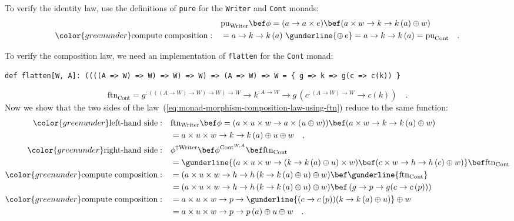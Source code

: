 To verify the identity law, use the definitions of \lstinline!pure!
for the \lstinline!Writer! and \lstinline!Cont! monads:
\begin{align*}
 & \text{pu}_{\text{Writer}}\bef\phi=(a\rightarrow a\times e)\bef(a\times w\rightarrow k\rightarrow k\left(a\right)\oplus w)\\
{\color{greenunder}\text{compute composition}:}\quad & =a\rightarrow k\rightarrow k\left(a\right)\,\gunderline{\oplus\,e}=a\rightarrow k\rightarrow k\left(a\right)=\text{pu}_{\text{Cont}}\quad.
\end{align*}

To verify the composition law, we need an implementation of \lstinline!flatten!
for the \lstinline!Cont! monad:
\begin{lstlisting}
def flatten[W, A]: ((((A => W) => W) => W) => W) => (A => W) => W = { g => k => g(c => c(k)) }
\end{lstlisting}
\[
\text{ftn}_{\text{Cont}}=g^{:\left(\left(\left(A\rightarrow W\right)\rightarrow W\right)\rightarrow W\right)\rightarrow W}\rightarrow k^{:A\rightarrow W}\rightarrow g\,(c^{:\left(A\rightarrow W\right)\rightarrow W}\rightarrow c\left(k\right))\quad.
\]
Now we show that the two sides of the law~(\ref{eq:monad-morphism-composition-law-using-ftn})
reduce to the same function:
\begin{align*}
{\color{greenunder}\text{left-hand side}:}\quad & \text{ftn}_{\text{Writer}}\bef\phi=(a\times u\times w\rightarrow a\times(u\oplus w))\bef(a\times w\rightarrow k\rightarrow k\left(a\right)\oplus w)\\
 & =a\times u\times w\rightarrow k\rightarrow k\left(a\right)\oplus u\oplus w\quad,\\
{\color{greenunder}\text{right-hand side}:}\quad & \phi^{\uparrow\text{Writer}}\bef\phi^{\text{Cont}^{W,A}}\bef\text{ftn}_{\text{Cont}}\\
 & =\gunderline{(a\times u\times w\rightarrow(k\rightarrow k\left(a\right)\oplus u)\times w)\bef(c\times w\rightarrow h\rightarrow h\left(c\right)\oplus w)}\bef\text{ftn}_{\text{Cont}}\\
{\color{greenunder}\text{compute composition}:}\quad & =(a\times u\times w\rightarrow h\rightarrow h\left(k\rightarrow k\left(a\right)\oplus u\right)\oplus w)\bef\gunderline{\text{ftn}_{\text{Cont}}}\\
 & =(a\times u\times w\rightarrow h\rightarrow h\left(k\rightarrow k\left(a\right)\oplus u\right)\oplus w)\bef\left(g\rightarrow p\rightarrow g(c\rightarrow c\left(p\right))\right)\\
{\color{greenunder}\text{compute composition}:}\quad & =a\times u\times w\rightarrow p\rightarrow\gunderline{(c\rightarrow c\left(p\right))(k\rightarrow k\left(a\right)\oplus u)}\oplus w\\
 & =a\times u\times w\rightarrow p\rightarrow p\left(a\right)\oplus u\oplus w\quad.
\end{align*}


